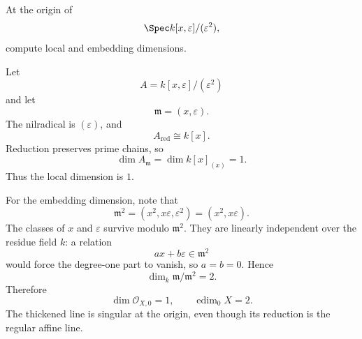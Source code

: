 \begin{problem}\label{prob:vi32-11}
At the origin of
\[
\Spec k[x,\varepsilon]/(\varepsilon^2),
\]
compute local and embedding dimensions.

\end{problem}

\ifdefined\FullProblemDossiers
\begin{solution}
Let
\[
A=k[x,\varepsilon]/(\varepsilon^2)
\]
and let
\[
\mathfrak m=(x,\varepsilon).
\]
The nilradical is \((\varepsilon)\), and
\[
A_{\mathrm{red}}\cong k[x].
\]
Reduction preserves prime chains, so
\[
\dim A_{\mathfrak m}
=
\dim k[x]_{(x)}
=
1.
\]
Thus the local dimension is \(1\).

For the embedding dimension, note that
\[
\mathfrak m^2=(x^2,x\varepsilon,\varepsilon^2)
=(x^2,x\varepsilon).
\]
The classes of \(x\) and \(\varepsilon\) survive modulo \(\mathfrak m^2\). They are linearly independent over the
residue field \(k\): a relation
\[
ax+b\varepsilon\in\mathfrak m^2
\]
would force the degree-one part to vanish, so \(a=b=0\). Hence
\[
\dim_k\mathfrak m/\mathfrak m^2=2.
\]
Therefore
\[
\boxed{
\dim\mathcal O_{X,0}=1,\qquad
\operatorname{edim}_0X=2.
}
\]
The thickened line is singular at the origin, even though its reduction is the regular affine line.
\end{solution}
\fi
